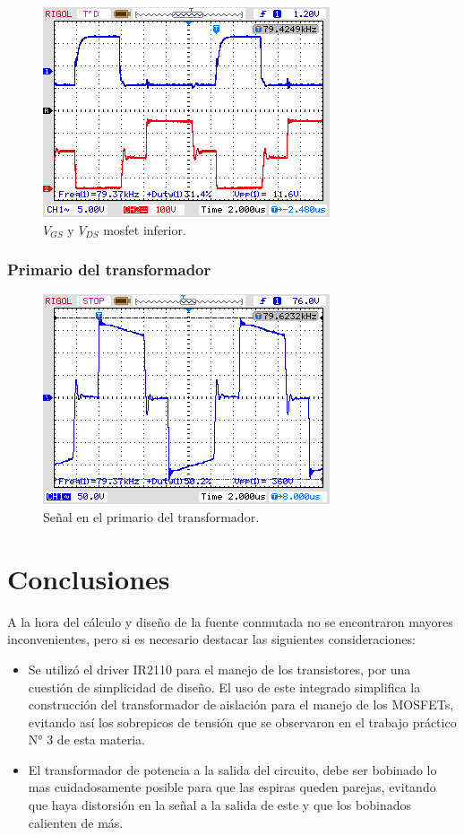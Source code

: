 \documentclass[11pt, a4paper]{article}
\begin{document}
\begin{figure}[H]
	\centering
	\includegraphics[width = 8 cm]{Imagenes/VGDi}
	\caption{$V_{GS}$ y $V_{DS}$ mosfet inferior.}
	\label{VGDI}
\end{figure}

\subsubsection{Primario del transformador}
\begin{figure}[h]
	\centering
	\includegraphics[width = 8 cm]{Imagenes/Vprim}
	\caption{Señal en el primario del transformador.}
	\label{primario}
\end{figure}

\section{Conclusiones}
A la hora del cálculo y diseño de la fuente conmutada no se encontraron mayores inconvenientes, pero si es necesario destacar las siguientes consideraciones:
\begin{itemize}
	\item Se utilizó el driver IR2110 para el manejo de los transistores, por una cuestión de simplicidad de diseño. El uso de este integrado simplifica la construcción del transformador de aislación para el manejo de los MOSFETs, evitando así los sobrepicos de tensión que se observaron en el trabajo práctico N° 3 de esta materia.
	\item El transformador de potencia a la salida del circuito, debe ser bobinado lo mas cuidadosamente posible para que las espiras queden parejas, evitando que haya distorsión en la señal a la salida de este y que los bobinados calienten de más.
\end{itemize}
\end{document}
